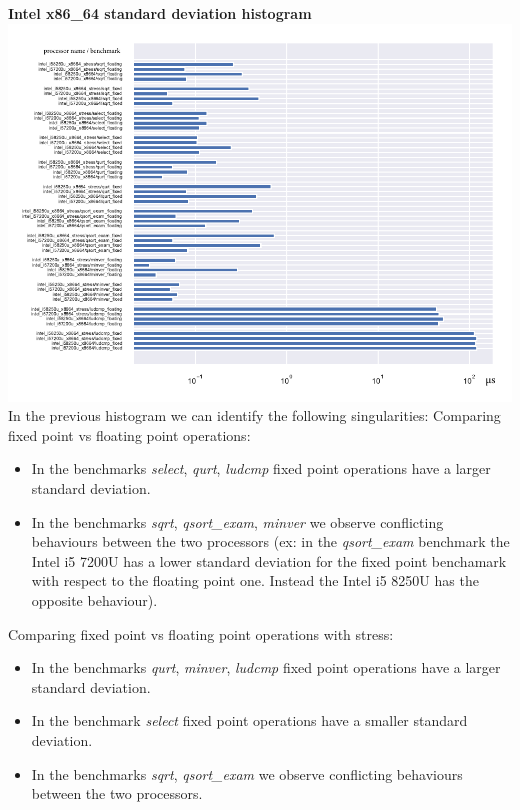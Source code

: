 \textbf{Intel x86\_64 standard deviation histogram}\newline
\hspace*{-3.2cm}
\includegraphics[width=570pt]{intel_stddev_histogram.pdf}
\clearpage
In the previous histogram we can identify the following singularities:
Comparing fixed point vs floating point operations:
\begin{itemize}
		\item In the benchmarks \textit{select}, \textit{qurt}, \textit{ludcmp} fixed point operations have a larger standard deviation.
		\item In the benchmarks \textit{sqrt}, \textit{qsort\_exam}, \textit{minver} we observe conflicting behaviours between the two processors (ex: in the \textit{qsort\_exam} benchmark the Intel i5 7200U has a lower standard deviation for the fixed point benchamark with respect to the floating point one. Instead the Intel i5 8250U has the opposite behaviour).
\end{itemize}
Comparing fixed point vs floating point operations with stress:
\begin{itemize}
		\item In the benchmarks \textit{qurt}, \textit{minver}, \textit{ludcmp} fixed point operations have a larger standard deviation.
		\item In the benchmark \textit{select} fixed point operations have a smaller standard deviation.
		\item In the benchmarks \textit{sqrt}, \textit{qsort\_exam} we observe conflicting behaviours between the two processors.
\end{itemize}

